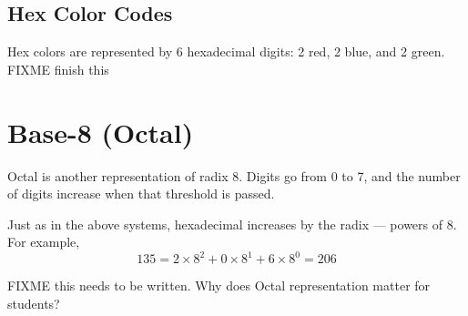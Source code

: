 \subsection{Hex Color Codes}

Hex colors are represented by 6 hexadecimal digits: 2 red, 2 blue, and 2 green. FIXME finish this


\section{Base-8 (Octal)}
Octal is another representation of radix 8. Digits go from 0 to 7, and the number of digits increase when that threshold is passed. 

Just as in the above systems, hexadecimal increases by the radix --- powers of 8. For example,
\[
135 = 2 \times 8^2 + 0\times 8^1 + 6\times 8^0 = 206
\]


FIXME this needs to be written. Why does Octal representation matter for students?
